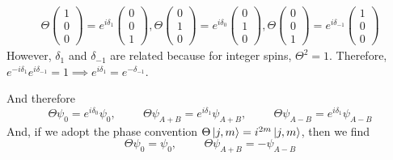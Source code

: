 \documentclass[12pt, letterpaper]{article}
\begin{document}
\begin{enumerate}
\begin{align}
        \Theta\left(\begin{array}{c}1\\0\\0\end{array}\right)=e^{i\delta_1}\left(\begin{array}{c}0\\0\\1\end{array}\right),\Theta\left(\begin{array}{c}0\\1\\0\end{array}\right)=e^{i\delta_0}\left(\begin{array}{c}0\\1\\0\end{array}\right),\Theta\left(\begin{array}{c}0\\0\\1\end{array}\right)=e^{i\delta_{-1}}\left(\begin{array}{c}1\\0\\0\end{array}\right)
    \end{align}
    However, $\delta_1$ and $\delta_{-1}$ are related because for integer spins, $\Theta^2=1$. Therefore, $e^{-i\delta_1}e^{i\delta_{-1}}=1\implies e^{i\delta_1}=e^{-\delta_{-1}}$. 
    
    And therefore
    \begin{equation}
        \Theta\psi_0=e^{i\delta_0}\psi_0,\hspace{1cm}\Theta\psi_{A+B}=e^{i\delta_{1}}\psi_{A+B},\hspace{1cm}\Theta\psi_{A-B}=e^{i\delta_1}\psi_{A-B}
    \end{equation}
    And, if we adopt the phase convention $\Theta\ket{j,m}=i^{2m}\ket{j,m}$, then we find
    \begin{equation}
            \Theta\psi_0=\psi_0,\hspace{1cm}\Theta\psi_{A+B}=-\psi_{A-B}
    \end{equation}

\end{enumerate}
\end{document}
